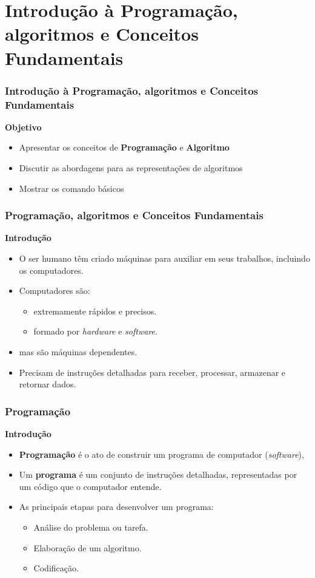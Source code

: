 \section{Introdução à Programação, algoritmos e Conceitos Fundamentais}
\begin{frame}
	\frametitle{Introdução à Programação, algoritmos e Conceitos Fundamentais}
	\textbf{Objetivo}
	\begin{itemize}
		\item Apresentar os conceitos de \textbf{Programação} e \textbf{Algoritmo}
		\item Discutir as abordagens para as representações de algoritmos
		\item Mostrar os comando básicos
	\end{itemize}
\end{frame}


\begin{frame}
	\frametitle{Programação, algoritmos e Conceitos Fundamentais}
	\textbf{Introdução}
	\begin{itemize}
		\item O ser humano têm criado máquinas para auxiliar em seus trabalhos, incluindo os computadores.
		\item Computadores são:
		\begin{itemize}
			\item extremamente rápidos e precisos.
			\item formado por \textit{hardware} e \textit{software}.
		\end{itemize}
		\item mas são máquinas dependentes.
		\item Precisam de instruções detalhadas para receber, processar, armazenar e retornar dados.
	\end{itemize}
\end{frame}


\begin{frame}
	\frametitle{Programação}
	\textbf{Introdução}
	\begin{itemize}
		\item \textbf{Programação} é o ato de construir um programa de computador (\textit{software}),
		\item Um \textbf{programa} é um conjunto de instruções detalhadas, representadas por um código que o computador entende.
		\item As principais etapas para desenvolver um programa:
		\begin{itemize}
			\item Análise do problema ou tarefa.
			\item Elaboração de um algoritmo.
			\item Codificação.
		\end{itemize}
	\end{itemize}
\end{frame}


